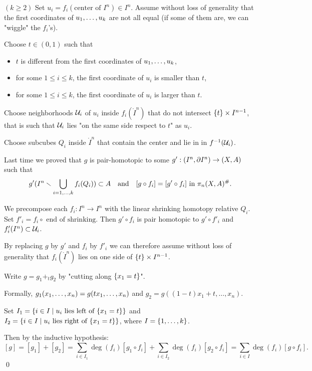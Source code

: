 
$(k\geq2)$ Set $u_i=f_i(\text{center of } I^n)\in I^n$. Assume without loss of generality that the first coordinates of ${{u}_1,\dots,{u}_{k}}$ are not all equal (if some of them are, we can "wiggle" the $f_i$'s).



Choose $t\in (0,1)$ such that
\begin{itemize}
    \item $t$ is different from the first coordinates of ${{u}_1,\dots,{u}_{k}}$,
    \item for some $1\leq i\leq k$, the first coordinate of $u_i$ is smaller than $t$,
    \item for some $1\leq i\leq k$, the first coordinate of $u_i$ is larger than $t$.
\end{itemize}

Choose neighborhoods $\mathcal{U}_i$ of $u_i$ inside $f_i(\ring I^n)$ that do not intersect $\{t\}\times I^{n-1}$, that is such that $\mathcal{U}_i$ lies "on the same side respect to $t$" as $u_i$.

Choose subcubes $Q_i$ inside $\ring I^n$ that contain the center and lie in in $f^{-1}(\mathcal{U}_i)$.

Last time we proved that $g$ is pair-homotopic to some $g':(I^n,\partial I^n)\to(X,A)$ such that
\[g'(I^n\smallsetminus\bigcup_{i=1,\dots,k} f_i(Q_i))\subset A\quad\text{and}\quad[g\circ f_i]=[g'\circ f_i]\text{ in }\pi_n(X,A)^\#.\]

We precompose each $f_i:I^n\to I^n$ with the linear shrinking homotopy relative $Q_i$. Set $f'_i=f_i\circ \text{ end of shrinking}$. Then $g'\circ f_i$ is pair homotopic to $g'\circ f'_i$ and $f'_i(I^n)\subset\mathcal{U}_i$.

By replacing $g$ by $g'$ and $f_i$ by $f'_i$ we can therefore assume without loss of generality that $f_i(\ring I^n)$ lies on one side of $\{t\}\times I^{n-1}$.

\smallskip

Write $g=g_1+_t g_2$ by "cutting along $\{x_1=t\}$".

Formally, $g_1({x_1,\dots,x_n})=g(t{x_1,\dots,x_n})$ and $g_2=g((1-t)x_1+t,\dots,x_n)$.

Set $I_1=\{i\in I\mid u_i\text{ lies left of }\{x_1=t\}\}$ and $I_2=\{i\in I\mid u_i\text{ lies right of }\{x_1=t\}\}$, where $I=\{1,\dots,k\}$.

Then by the inductive hypothesis:
\[[g]=[g_1]+[g_2]=\sum_{i\in I_1}\deg(f_i)[g_1\circ f_i]+\sum_{i\in I_2}\deg(f_i)[g_2\circ f_i]=\sum_{i\in I}\deg(f_i)[g\circ f_i].\]\qed

